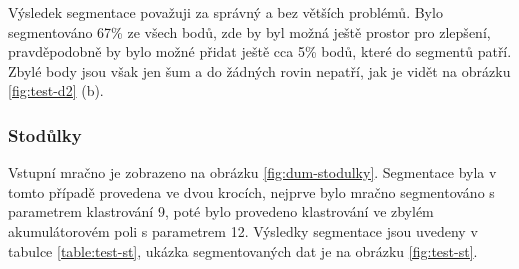 \documentclass[11pt,twoside,a4paper]{book}
\begin{document}
Výsledek segmentace považuji za správný a bez větších problémů. Bylo segmentováno 67\% ze všech bodů, zde by byl možná ještě prostor pro zlepšení, pravděpodobně by bylo možné přidat ještě cca 5\% bodů, které do segmentů patří. Zbylé body jsou však jen šum a do žádných rovin nepatří, jak je vidět na obrázku \ref{fig:test-d2} (b). 

\cleardoublepage
\subsubsection{Stodůlky}

Vstupní mračno je zobrazeno na obrázku \ref{fig:dum-stodulky}. Segmentace byla v tomto případě provedena ve dvou krocích, nejprve bylo mračno segmentováno s parametrem klastrování 9, poté bylo provedeno klastrování ve zbylém akumulátorovém poli s parametrem 12. Výsledky segmentace jsou uvedeny v tabulce \ref{table:test-st}, ukázka segmentovaných dat je na obrázku \ref{fig:test-st}.
\end{document}
